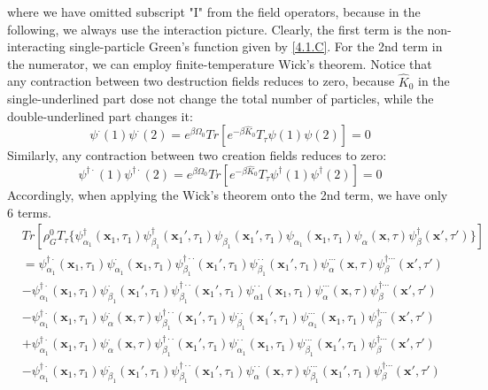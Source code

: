 where we have omitted subscript "I" from the field operators, because in the following, we always use the interaction picture.
Clearly, the first term is the non-interacting single-particle Green's function given by \ref{4.1.C}.
For the 2nd term in the numerator, we can employ finite-temperature Wick's theorem.
Notice that any contraction between two destruction fields reduces to zero, because $\hat{K}_0$ in the single-underlined part dose not change the total number of particles, while the double-underlined part changes it:
$$
\psi^\cdot(1)\psi^\cdot(2)=e^{\beta\Omega_0} Tr\left[e^{-\beta\hat{K}_0}T_\tau{\psi(1)\psi(2)}\right]=0
$$
Similarly, any contraction between two creation fields reduces to zero:
$$
\psi^{\dagger\cdot}(1)\psi^{\dagger\cdot}(2)=e^{\beta\Omega_0} Tr\left[e^{-\beta\hat{K}_0}T_\tau{\psi^\dagger(1)\psi^\dagger(2)}\right]=0
$$
Accordingly, when applying the Wick's theorem onto the 2nd term, we have only 6 terms.
$$
\begin{aligned}
&Tr\left[\rho_G^0 T_\tau \{\psi_{\alpha_1}^\dagger (\mathbf{x}_1,\tau_1) \psi_{\beta_1}^\dagger (\mathbf{x}_1',\tau_1) \psi_{\beta_1} (\mathbf{x}_1',\tau_1) \psi_{\alpha_1} (\mathbf{x}_1,\tau_1) \psi_\alpha(\mathbf{x},\tau) \psi_\beta^\dagger(\mathbf{x'},\tau')\}\right]\\
&=\psi_{\alpha_1}^{\dagger\cdot} (\mathbf{x}_1,\tau_1) \psi_{\alpha_1}^{\cdot} (\mathbf{x}_1,\tau_1) \psi_{\beta_1}^{\dagger\cdot\cdot} (\mathbf{x}_1',\tau_1) \psi_{\beta_1}^{\cdot\cdot} (\mathbf{x}_1',\tau_1) \psi_{\alpha}^{\cdots} (\mathbf{x},\tau) \psi_{\beta}^{\dagger\cdots} (\mathbf{x'},\tau')\\
&-\psi_{\alpha_1}^{\dagger\cdot} (\mathbf{x}_1,\tau_1) \psi_{\beta_1}^{\cdot} (\mathbf{x}_1',\tau_1) \psi_{\beta_1}^{\dagger\cdot\cdot} (\mathbf{x}_1',\tau_1) \psi_{\alpha1}^{\cdot\cdot} (\mathbf{x}_1,\tau_1) \psi_\alpha^{\cdots}(\mathbf{x},\tau) \psi_\beta^{\dagger\cdots}(\mathbf{x'},\tau')\\
&-\psi_{\alpha_1}^{\dagger\cdot} (\mathbf{x}_1,\tau_1) \psi_{\alpha}^{\cdot} (\mathbf{x},\tau) \psi_{\beta_1}^{\dagger\cdot\cdot} (\mathbf{x}_1',\tau_1) \psi_{\beta_1}^{\cdot\cdot} (\mathbf{x}_1',\tau_1) \psi_{\alpha_1}^{\cdots}(\mathbf{x}_1,\tau_1) \psi_\beta^{\dagger\cdots}(\mathbf{x'},\tau')\\
&+\psi_{\alpha_1}^{\dagger\cdot} (\mathbf{x}_1,\tau_1) \psi_{\alpha}^{\cdot} (\mathbf{x},\tau) \psi_{\beta_1}^{\dagger\cdot\cdot} (\mathbf{x}_1',\tau_1) \psi_{\alpha_1}^{\cdot\cdot} (\mathbf{x}_1,\tau_1) \psi_{\beta_1}^{\cdots}(\mathbf{x}_1',\tau_1) \psi_\beta^{\dagger\cdots}(\mathbf{x'},\tau')\\
&-\psi_{\alpha_1}^{\dagger\cdot} (\mathbf{x}_1,\tau_1) \psi_{\beta_1}^{\cdot} (\mathbf{x}_1',\tau_1) \psi_{\beta_1}^{\dagger\cdot\cdot} (\mathbf{x}_1',\tau_1) \psi_{\alpha}^{\cdot\cdot} (\mathbf{x},\tau) \psi_{\beta_1}^{\cdots}(\mathbf{x}_1',\tau_1) \psi_\beta^{\dagger\cdots}(\mathbf{x'},\tau')\\
\end{aligned}
$$
